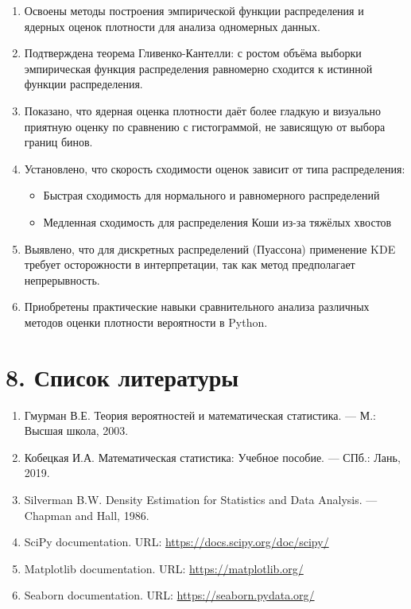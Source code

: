 \documentclass[a4paper,14pt]{extarticle}
\begin{document}
\begin{enumerate}
    \item Освоены методы построения эмпирической функции распределения и ядерных оценок плотности для анализа одномерных данных.
    
    \item Подтверждена теорема Гливенко-Кантелли: с ростом объёма выборки эмпирическая функция распределения равномерно сходится к истинной функции распределения.
    
    \item Показано, что ядерная оценка плотности даёт более гладкую и визуально приятную оценку по сравнению с гистограммой, не зависящую от выбора границ бинов.
    
    \item Установлено, что скорость сходимости оценок зависит от типа распределения:
    \begin{itemize}
        \item Быстрая сходимость для нормального и равномерного распределений
        \item Медленная сходимость для распределения Коши из-за тяжёлых хвостов
    \end{itemize}
    
    \item Выявлено, что для дискретных распределений (Пуассона) применение KDE требует осторожности в интерпретации, так как метод предполагает непрерывность.
    
    \item Приобретены практические навыки сравнительного анализа различных методов оценки плотности вероятности в Python.
\end{enumerate}

\section*{8. Список литературы}

\begin{enumerate}
    \item Гмурман В.Е. Теория вероятностей и математическая статистика. — М.: Высшая школа, 2003.
    
    \item Кобецкая И.А. Математическая статистика: Учебное пособие. — СПб.: Лань, 2019.
    
    \item Silverman B.W. Density Estimation for Statistics and Data Analysis. — Chapman and Hall, 1986.
    
    \item SciPy documentation. URL: \url{https://docs.scipy.org/doc/scipy/}
    
    \item Matplotlib documentation. URL: \url{https://matplotlib.org/}
    
    \item Seaborn documentation. URL: \url{https://seaborn.pydata.org/}
\end{enumerate}
\end{document}
